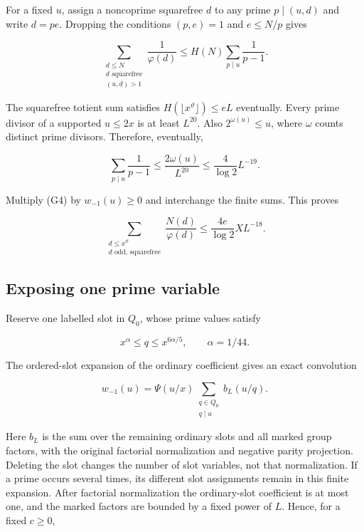 For a fixed \(u\), assign a noncoprime squarefree \(d\) to any prime
\(p\mid(u,d)\) and write \(d=pe\). Dropping the conditions \((p,e)=1\)
and \(e\le N/p\) gives

\[
\sum_{\substack{d\le N\\d\text{ squarefree}\\(u,d)>1}}
 \frac1{\varphi(d)}
 \le H(N)\sum_{p\mid u}\frac1{p-1}. \tag{G4}
\]

The squarefree totient sum satisfies
\(H(\lfloor x^\vartheta\rfloor)\le eL\) eventually. Every prime divisor
of a supported \(u\le2x\) is at least \(L^{20}\). Also
\(2^{\omega(u)}\le u\), where \(\omega\) counts distinct prime divisors.
Therefore, eventually,

\[
\sum_{p\mid u}\frac1{p-1}
 \le\frac{2\omega(u)}{L^{20}}
 \le\frac4{\log2}L^{-19}.
\]

Multiply (G4) by \(w_{-1}(u)\ge0\) and interchange the finite sums. This
proves

\[
\sum_{\substack{d\le x^\vartheta\\d\text{ odd, squarefree}}}
 \frac{N(d)}{\varphi(d)}
 \le\frac{4e}{\log2}XL^{-18}. \tag{G5}
\]


\hypertarget{congruences-exposing-one-prime-variable}{%
\subsection{Exposing one prime
variable}\label{congruences-exposing-one-prime-variable}}

Reserve one labelled slot in \(Q_0\), whose prime values satisfy

\[
x^\alpha\le q\le x^{6\alpha/5},\qquad \alpha=1/44.
\]

The ordered-slot expansion of the ordinary coefficient gives an exact
convolution

\[
w_{-1}(u)=\Psi(u/x)
 \sum_{\substack{q\in Q_0\\q\mid u}}b_L(u/q). \tag{G6}
\]

Here \(b_L\) is the sum over the remaining ordinary slots and all marked
group factors, with the original factorial normalization and negative
parity projection. Deleting the slot changes the number of slot
variables, not that normalization. If a prime occurs several times, its
different slot assignments remain in this finite expansion. After
factorial normalization the ordinary-slot coefficient is at most one,
and the marked factors are bounded by a fixed power of \(L\). Hence, for
a fixed \(c\ge0\),

